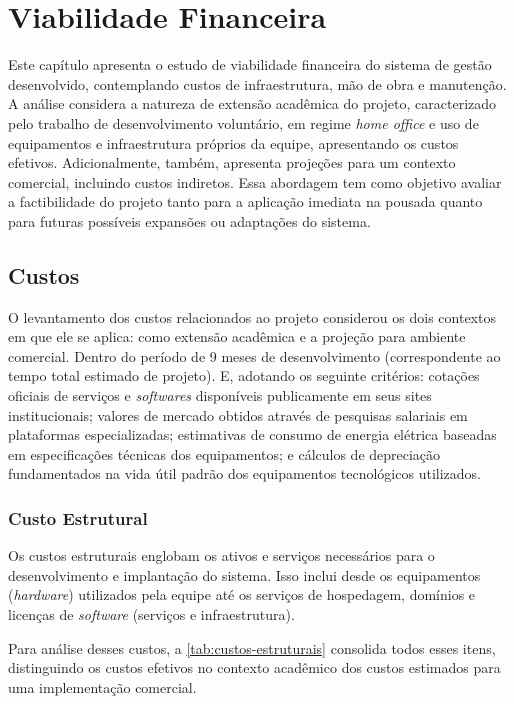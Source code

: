 \documentclass[
	12pt,				%
	openany,			%
	oneside,			%
	a4paper,			%
	english,			%
	french,				%
	spanish,			%
	brazil				%
	]{abntex2}
\begin{document}
\chapter{Viabilidade Financeira}
Este capítulo apresenta o estudo de viabilidade financeira do sistema de gestão desenvolvido, contemplando custos de infraestrutura, mão de obra e manutenção. A análise considera a natureza de extensão acadêmica do projeto, caracterizado pelo trabalho de desenvolvimento voluntário, em regime \textit{home office} e uso de equipamentos e infraestrutura próprios da equipe, apresentando os custos efetivos. Adicionalmente, também, apresenta projeções para um contexto comercial, incluindo custos indiretos. Essa abordagem tem como objetivo avaliar a factibilidade do projeto tanto para a aplicação imediata na pousada quanto para futuras possíveis expansões ou adaptações do sistema.


\section{Custos} 
O levantamento dos custos relacionados ao projeto considerou os dois contextos em que ele se aplica: como extensão acadêmica e a projeção para ambiente comercial. Dentro do período de 9 meses de desenvolvimento (correspondente ao tempo total estimado de projeto). E, adotando os seguinte critérios: cotações oficiais de serviços e \textit{softwares} disponíveis publicamente em seus sites institucionais; valores de mercado obtidos através de pesquisas salariais em plataformas especializadas; estimativas de consumo de energia elétrica baseadas em especificações técnicas dos equipamentos; e cálculos de depreciação fundamentados na vida útil padrão dos equipamentos tecnológicos utilizados.


\subsection{Custo Estrutural}
Os custos estruturais englobam os ativos e serviços necessários para o desenvolvimento e implantação do sistema. Isso inclui desde os equipamentos (\textit{hardware}) utilizados pela equipe até os serviços de hospedagem, domínios e licenças de \textit{software} (serviços e infraestrutura).

Para análise desses custos, a \autoref{tab:custos-estruturais} consolida todos esses itens, distinguindo os custos efetivos no contexto acadêmico dos custos estimados para uma implementação comercial.
\end{document}

